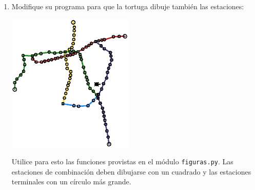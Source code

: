 \begin{enumerate}[leftmargin=0pt,label=\emph{\alph*})]
  \newpage
  \item
    Modifique su programa para que la tortuga
    dibuje también las estaciones:

    \includegraphics[height=250px]{metro/red2}

    Utilice para esto las funciones provistas
    en el módulo \texttt{figuras.py}.
    Las estaciones de combinación deben dibujarse
    con un cuadrado
    y las estaciones terminales
    con un círculo más grande.
\end{enumerate}


